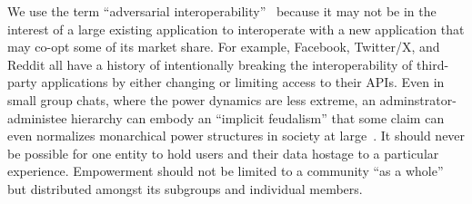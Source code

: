 We use the term ``adversarial interoperability''~\cite{adversarialinterop} because it may not be in the
interest of a large existing application to interoperate with a new application that may co-opt some of its market share.
For example, Facebook, Twitter/X, and Reddit all have a history of intentionally breaking
the interoperability of third-party applications by either changing or limiting access to their APIs.
Even in small group chats, where the power dynamics are less extreme,
an adminstrator-administee hierarchy
can embody an ``implicit feudalism'' that some claim can even
normalizes monarchical power structures in society at large~\cite{governablespaces}.
It should never be possible for one entity to hold users
and their data hostage to a particular experience.
Empowerment should not be limited to a community ``as a whole'' but
distributed amongst its subgroups and individual members.









